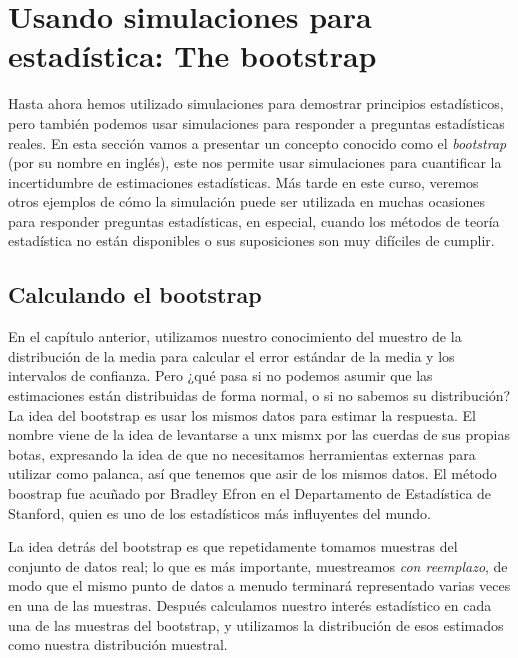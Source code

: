 \documentclass[
  12pt,
]{book}
\theoremstyle{definition}
\theoremstyle{definition}
\theoremstyle{definition}
\theoremstyle{remark}
\begin{document}
\hypertarget{usando-simulaciones-para-estaduxedstica-the-bootstrap}{%
\section{Usando simulaciones para estadística: The bootstrap}\label{usando-simulaciones-para-estaduxedstica-the-bootstrap}}

Hasta ahora hemos utilizado simulaciones para demostrar principios estadísticos, pero también podemos usar simulaciones para responder a preguntas estadísticas reales. En esta sección vamos a presentar un concepto conocido como el \emph{bootstrap} (por su nombre en inglés), este nos permite usar simulaciones para cuantificar la incertidumbre de estimaciones estadísticas. Más tarde en este curso, veremos otros ejemplos de cómo la simulación puede ser utilizada en muchas ocasiones para responder preguntas estadísticas, en especial, cuando los métodos de teoría estadística no están disponibles o sus suposiciones son muy difíciles de cumplir.

\hypertarget{calculando-el-bootstrap}{%
\subsection{Calculando el bootstrap}\label{calculando-el-bootstrap}}

En el capítulo anterior, utilizamos nuestro conocimiento del muestro de la distribución de la media para calcular el error estándar de la media y los intervalos de confianza. Pero ¿qué pasa si no podemos asumir que las estimaciones están distribuidas de forma normal, o si no sabemos su distribución? La idea del bootstrap es usar los mismos datos para estimar la respuesta. El nombre viene de la idea de levantarse a unx mismx por las cuerdas de sus propias botas, expresando la idea de que no necesitamos herramientas externas para utilizar como palanca, así que tenemos que asir de los mismos datos. El método boostrap fue acuñado por Bradley Efron en el Departamento de Estadística de Stanford, quien es uno de los estadísticos más influyentes del mundo.

La idea detrás del bootstrap es que repetidamente tomamos muestras del conjunto de datos real; lo que es más importante, muestreamos \emph{con reemplazo}, de modo que el mismo punto de datos a menudo terminará representado varias veces en una de las muestras. Después calculamos nuestro interés estadístico en cada una de las muestras del bootstrap, y utilizamos la distribución de esos estimados como nuestra distribución muestral.
\end{document}
